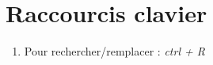 \documentclass[12pt, letterpaper]{article}
\begin{document}
\section{Raccourcis clavier}
\begin{enumerate}
\item Pour rechercher/remplacer : \textit{ctrl + R}
\end{enumerate}
\end{document}
